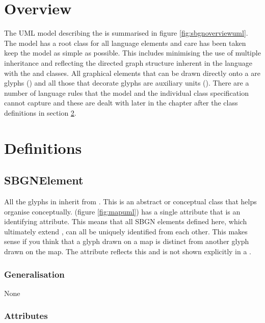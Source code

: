 \section{Overview}

The UML model describing the \PDl is summarised in figure
\ref{fig:sbgnoverviewuml}. The model has a root class
 for all language elements and care has been
taken keep the model as simple as possible. This includes minimising
the use of multiple inheritance and reflecting the directed graph
structure inherent in the language with the  and
 classes. All graphical elements that can be drawn
directly onto a \PDm are glyphs () and all those
that decorate glyphs are auxiliary units
(). There are a number of language rules that
the model and the individual class specification cannot capture and
these are dealt with later in the chapter after the class definitions
in section \ref{sec:definitions}.

\section{Definitions}
\label{sec:definitions}

\subsection{SBGNElement}
\label{defn:SBGNElement}

All the glyphs in \SBGNPDLone inherit from
. This is an abstract or conceptual class that
helps organise \PD conceptually.  (figure
\ref{fig:mapuml}) has a single attribute  that is an
identifying attribute. This means that all SBGN elements defined here,
which ultimately extend , can all be uniquely
identified from each other. This makes sense if you think that a glyph
drawn on a map is distinct from another glyph drawn on the map. The
 attribute reflects this and is not shown explicitly in a
\PDm.


\subsubsection{Generalisation}

None

\subsubsection{Attributes}

